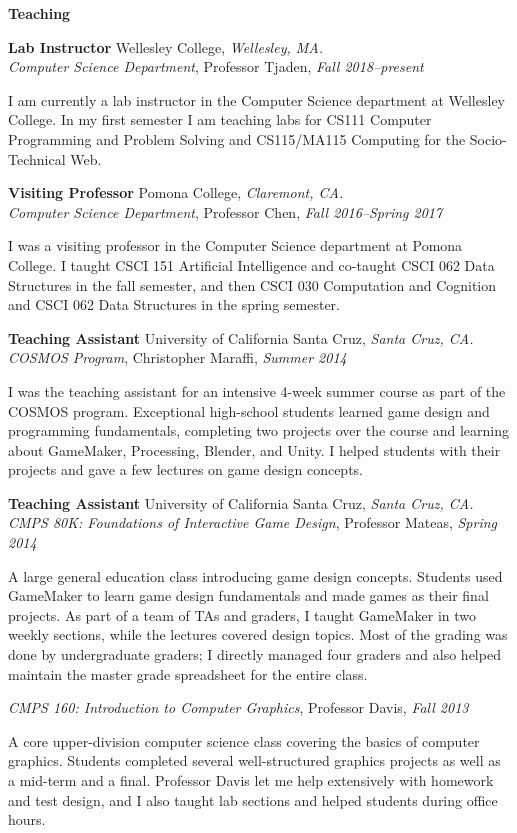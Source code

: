 \documentclass[11pt]{article}
\newenvironment{sct}[1]{%
  \vspace{8pt plus 2pt minus 4pt}\textbf{\Large #1} \hrulefill\vspace{6pt}
  \begin{adjustwidth}{6pt}{0pt}
}{%
  \end{adjustwidth}
}
\newcommand{\indented}[1]{\hspace*{\fill}\parbox{\textwidth-22pt}{#1}}
\newcommand{\teachingexperience}[7]{%
  \textbf{#1} #2, \textit{#3.} \\
  \textit{#4}, #5, \textit{#6} \\
  \indented{#7}
  \vspace{7pt plus 2pt minus 2pt}
}
\newcommand{\combexp}[4]{%
  \textbf{#1} #2, \textit{#3.} \\
  #4 \vspace{7pt plus 2pt minus 2pt}
}
\begin{document}
\begin{sct}{Teaching}

\teachingexperience{Lab Instructor}{Wellesley College}{Wellesley, MA}%
{Computer Science Department}{Professor Tjaden}{Fall 2018--present}%
{I am currently a lab instructor in the Computer Science department at
Wellesley College. In my first semester I am teaching labs for CS111 Computer
Programming and Problem Solving and CS115/MA115 Computing for the
Socio-Technical Web.}

\teachingexperience{Visiting Professor}{Pomona College}{Claremont, CA}%
{Computer Science Department}{Professor Chen}{Fall 2016--Spring 2017}%
{I was a visiting professor in the Computer Science department at Pomona
College. I taught CSCI 151 Artificial Intelligence and co-taught CSCI 062 Data
Structures in the fall semester, and then CSCI 030 Computation and Cognition
and CSCI 062 Data Structures in the spring semester.}

\teachingexperience{Teaching Assistant}{University of California Santa Cruz}{Santa Cruz, CA}%
{COSMOS Program}{Christopher Maraffi}{Summer 2014}
{I was the teaching assistant for an intensive 4-week summer course as part of
the COSMOS program. Exceptional high-school students learned game design and
programming fundamentals, completing two projects over the course and learning
about GameMaker, Processing, Blender, and Unity. I helped students with their
projects and gave a few lectures on game design concepts.}

\combexp{Teaching Assistant}{University of California Santa Cruz}{Santa Cruz, CA}%
{
\textit{CMPS 80K: Foundations of Interactive Game Design}, Professor Mateas, \textit{Spring 2014} \\
\indented{
A large general education class introducing game design concepts. Students used
GameMaker to learn game design fundamentals and made games as their final
projects. As part of a team of TAs and graders, I taught GameMaker in two
weekly sections, while the lectures covered design topics. Most of the grading
was done by undergraduate graders; I directly managed four graders and also
helped maintain the master grade spreadsheet for the entire class.
}
\vspace{6pt}

\textit{CMPS 160: Introduction to Computer Graphics}, Professor Davis, \textit{Fall 2013} \\
\indented{
A core upper-division computer science class covering the basics of computer
graphics. Students completed several well-structured graphics projects as well
as a mid-term and a final. Professor Davis let me help extensively with
homework and test design, and I also taught lab sections and helped students
during office hours.
}
\vspace{6pt}

}
\end{sct}
\end{document}
